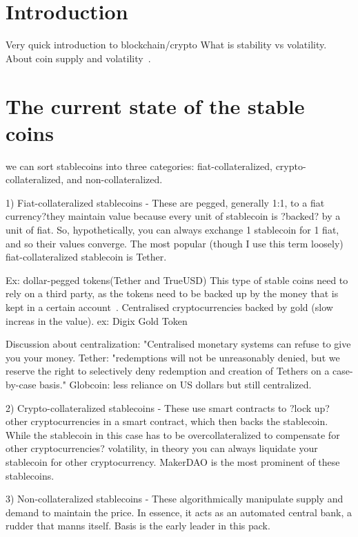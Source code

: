 \section{Introduction}
Very quick introduction to blockchain/crypto
What is stability vs volatility.
About coin supply and volatility~\cite{sams2015note}.



\section{The current state of the stable coins} %


we can sort stablecoins into three categories: fiat-collateralized, crypto-collateralized, and non-collateralized.

1) Fiat-collateralized stablecoins - These are pegged, generally 1:1, to a fiat currency?they maintain value because every unit of stablecoin is ?backed? by a unit of fiat. So, hypothetically, you can always exchange 1 stablecoin for 1 fiat, and so their values converge. The most popular (though I use this term loosely) fiat-collateralized stablecoin is Tether.

Ex: dollar-pegged tokens(Tether and TrueUSD)
This type of stable coins need to rely on a third party, as the tokens need to be backed up by the money that is kept in a certain account~\cite{techrev}. Centralised cryptocurrencies backed by gold (slow increas in the value). ex: Digix Gold Token

Discussion about centralization: "Centralised monetary systems can refuse to give you your money. Tether: "redemptions will not be unreasonably denied, but we reserve the right to selectively deny redemption and creation of Tethers on a case-by-case basis." Globcoin: less reliance on US dollars but still centralized.~\cite{cryptoinsider}

2) Crypto-collateralized stablecoins - These use smart contracts to ?lock up? other cryptocurrencies in a smart contract, which then backs the stablecoin. While the stablecoin in this case has to be overcollateralized to compensate for other cryptocurrencies? volatility, in theory you can always liquidate your stablecoin for other cryptocurrency. MakerDAO is the most prominent of these stablecoins.

3) Non-collateralized stablecoins - These algorithmically manipulate supply and demand to maintain the price. In essence, it acts as an automated central bank, a rudder that manns itself. Basis is the early leader in this pack.

